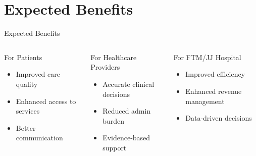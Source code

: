 \documentclass[aspectratio=169]{beamer}
\begin{document}
\section{Expected Benefits}
\begin{frame}{Expected Benefits}
    \begin{columns}[T]
            \begin{block}{For Patients}
                \begin{itemize}
                    \item Improved care quality
                    \item Enhanced access to services
                    \item Better communication
                \end{itemize}
            \end{block}
            
            \begin{block}{For Healthcare Providers}
                \begin{itemize}
                    \item Accurate clinical decisions
                    \item Reduced admin burden
                    \item Evidence-based support
                \end{itemize}
            \end{block}
            

            \begin{block}{For FTM/JJ Hospital}
                \begin{itemize}
                    \item Improved efficiency
                    \item Enhanced revenue management
                    \item Data-driven decisions
                \end{itemize}
            \end{block}
    \end{columns}
\end{frame}

\end{document}
